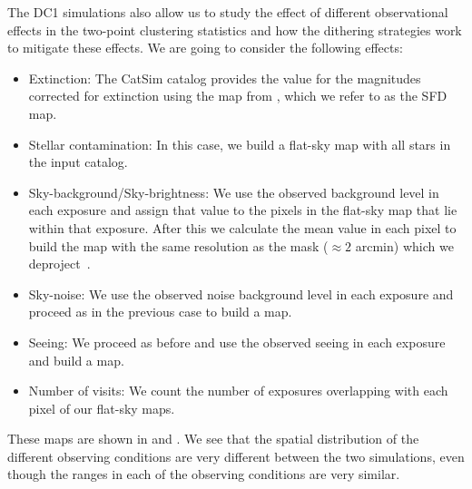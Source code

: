 \documentclass[twocolumn]{aastex62}
\begin{document}
The DC1 simulations also allow us to study the effect of different observational effects in the two-point clustering statistics and how the dithering strategies work to mitigate these effects. We are going to consider the following effects:

\begin{itemize}
\item Extinction: The CatSim catalog provides the value for the magnitudes corrected for extinction using the map from \citet{1998ApJ...500..525S}, which we refer to as the SFD map.
\item Stellar contamination: In this case, we build a flat-sky map with all stars in the input catalog.
\item Sky-background/Sky-brightness: We use the observed background level in each exposure and assign that value to the pixels in the flat-sky map that lie within that exposure. After this we calculate the mean value in each pixel to build the map with the same resolution as the mask ($\approx 2$ arcmin) which we deproject~\citep{2019MNRAS.484.4127A}. 
\item Sky-noise: We use the observed noise background level in each exposure and proceed as in the previous case to build a map.
\item Seeing: We proceed as before and use the observed seeing in each exposure and build a map.
\item Number of visits: We count the number of exposures overlapping with each pixel of our flat-sky maps.
\end{itemize}
These maps are shown in  and . We see that the spatial distribution of the different observing conditions are very different between the two simulations, even though the ranges in each of the observing conditions are very similar. 
\end{document}
